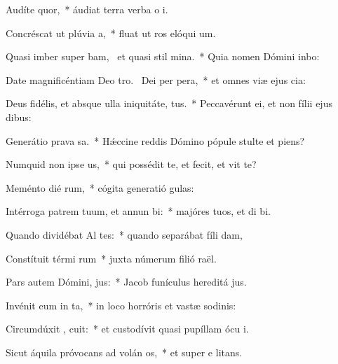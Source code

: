 \item Audíte   quor,~* áudiat terra verba o i.
\item Concréscat ut plúvia  a,~* fluat ut ros elóqui um.
\item Quasi imber super bam,~\pscross{} et quasi stil  mina.~* Quia nomen Dómini inbo:
\item Date magnificéntiam Deo tro.~\pscross{} Dei per  pera,~* et omnes viæ ejus cia:
\item Deus fidélis, et absque ulla iniquitáte,   tus.~* Peccavérunt ei, et non fílii ejus  dibus:
\item Generátio prava  sa.~* Hǽccine reddis Dómino pópule stulte et piens?
\item Numquid non ipse   us,~* qui possédit te, et fecit, et vit te?
\item Meménto dié rum,~* cógita generatió gulas:
\item Intérroga patrem tuum, et annun bi:~* majóres tuos, et di bi.
\item Quando dividébat Al tes:~* quando separábat fíli dam,
\item Constítuit térmi rum~* juxta númerum filió raël.
\item Pars autem Dómini,  jus:~* Jacob funículus hereditá jus.
\item Invénit eum in  ta,~* in loco horróris et vastæ sodinis:
\item Circumdúxit ,  cuit:~* et custodívit quasi pupíllam ócu i.
\item Sicut áquila próvocans ad volán  os,~* et super e litans.
